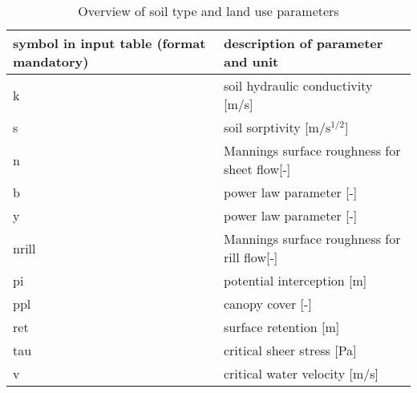 \begin{table}%
  \centering
    \caption{Overview of soil type and land use parameters}
    \begin{tabular}{p{3.8cm}l}
    \hline  \hline
        symbol in input table (format mandatory) & description of parameter and unit \\
    \hline
        k&  soil hydraulic conductivity [m/s]\\
        s&  soil sorptivity [$\mathrm{m/s^{1/2}}$]\\
        n&   Mannings surface roughness for sheet flow[-] \\
        b&   power law parameter [-] \\
        y&   power law parameter [-] \\
        nrill&  Mannings surface roughness for rill flow[-] \\
        pi&   potential interception [m]\\
        ppl& canopy cover [-] \\
        ret& surface retention [m] \\
        tau& critical sheer stress [Pa] \\
        v &  critical water velocity [m/s] \\
    \hline  \hline
    \end{tabular}%
  \label{tab:soilveg}%
\end{table}%
